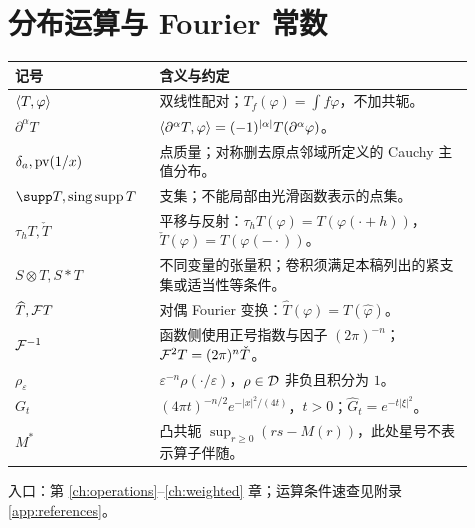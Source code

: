 \section*{分布运算与 Fourier 常数}
\begin{longtable}{p{0.27\linewidth}p{0.64\linewidth}}
\toprule 记号 & 含义与约定\\\midrule\endhead
$\langle T,\varphi\rangle$ & 双线性配对；$T_f(\varphi)=\int f\varphi$，不加共轭。\\
$\partial^\alpha T$ & $\langle \partial^\alpha T,\varphi\rangle=(-1)^{|\alpha|}T(\partial^\alpha\varphi)$。\\
$\delta_a,\operatorname{pv}(1/x)$ & 点质量；对称删去原点邻域所定义的 Cauchy 主值分布。\\
$\supp T,\operatorname{sing\,supp}T$ & 支集；不能局部由光滑函数表示的点集。\\
$\tau_hT,\check T$ & 平移与反射：$\tau_hT(\varphi)=T(\varphi(\cdot+h))$，$\check T(\varphi)=T(\varphi(-\cdot))$。\\
$S\otimes T,S*T$ & 不同变量的张量积；卷积须满足本稿列出的紧支集或适当性等条件。\\
$\widehat T,\mathcal{F} T$ & 对偶 Fourier 变换：$\widehat T(\varphi)=T(\widehat\varphi)$。\\
$\mathcal{F}^{-1}$ & 函数侧使用正号指数与因子 $(2\pi)^{-n}$；$\mathcal{F}^2T=(2\pi)^n\check T$。\\
$\rho_\varepsilon$ & $\varepsilon^{-n}\rho(\cdot/\varepsilon)$，$\rho\in\mathcal{D}$ 非负且积分为 $1$。\\
$G_t$ & $(4\pi t)^{-n/2}e^{-|x|^2/(4t)}$，$t>0$；$\widehat G_t=e^{-t|\xi|^2}$。\\
$M^*$ & 凸共轭 $\sup_{r\ge0}(rs-M(r))$，此处星号不表示算子伴随。\\
\bottomrule\end{longtable}
入口：第 \ref{ch:operations}--\ref{ch:weighted} 章；运算条件速查见附录 \ref{app:references}。

\clearpage
